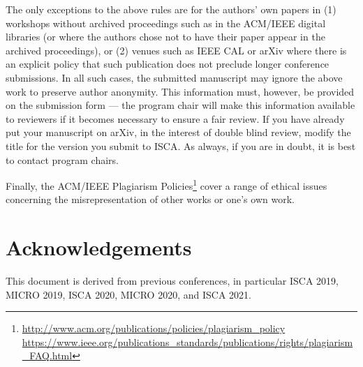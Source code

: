 \documentclass[conference]{IEEEtran}
\begin{document}
The only exceptions to the above rules are for the authors' own papers
in (1) workshops without archived proceedings such as in the ACM/IEEE
digital libraries (or where the authors chose not to have their paper
appear in the archived proceedings), or (2) venues such as IEEE CAL or
arXiv where there is an explicit policy that such publication does not
preclude longer conference submissions.  In all such cases, the
submitted manuscript may ignore the above work to preserve author
anonymity. This information must, however, be provided on the
submission form --- the program chair will make this information available
to reviewers if it becomes necessary to ensure a fair review.
If you have already put your manuscript on arXiv, in the interest of
double blind review, modify the title for the version you submit to ISCA.
As always, if you are in doubt, it is best to contact program chairs.


Finally, the ACM/IEEE Plagiarism Policies\footnote{\url{http://www.acm.org/publications/policies/plagiarism_policy}\\
\url{https://www.ieee.org/publications_standards/publications/rights/plagiarism_FAQ.html}}
cover a range of ethical issues concerning the misrepresentation of
other works or one's own work.


\section*{Acknowledgements}
This document is derived from previous conferences,
in particular ISCA 2019, MICRO 2019, ISCA 2020, MICRO 2020, and ISCA 2021.





\end{document}
